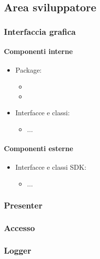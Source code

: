 \documentclass[../Funzionalita.tex]{subfiles}
\begin{document}
\subsection{Area sviluppatore}
\label{subsec:AreaSviluppatore}


	\subsubsection{Interfaccia grafica}
			\paragraph*{Componenti interne}
			\begin{itemize}
			
				\item Package:
				\begin{itemize}
					\item[]
					\item[]
				\end{itemize}
				
				\item Interfacce e classi:
				\begin{itemize}
					\item[] ...
				\end{itemize}
				
			\end{itemize}
			
			
			\paragraph*{Componenti esterne}
			
			\begin{itemize}
				\item Interfacce e classi SDK:
				\begin{itemize}
					\item[] ...
				\end{itemize}
			\end{itemize}
			
	\subsubsection{Presenter}
	
	
	\subsubsection{Accesso}
	
	\subsubsection{Logger}
\end{document}
